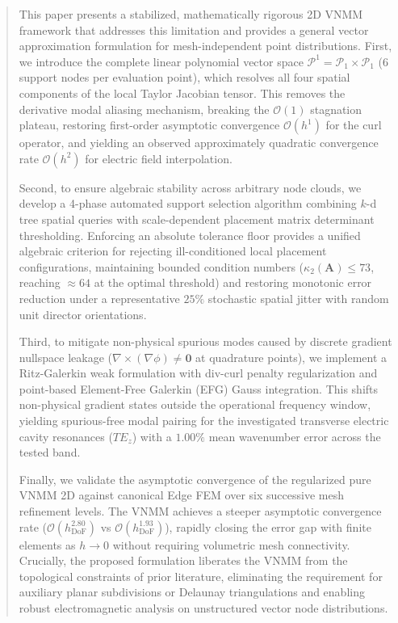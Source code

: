 \documentclass[preprint,12pt]{elsarticle}
\begin{document}
\begin{frontmatter}
\begin{abstract}
This paper presents a stabilized, mathematically rigorous 2D VNMM framework that addresses this limitation and provides a general vector approximation formulation for mesh-independent point distributions. First, we introduce the complete linear polynomial vector space $\mathcal{P}^1 = \mathcal{P}_1 \times \mathcal{P}_1$ ($6$ support nodes per evaluation point), which resolves all four spatial components of the local Taylor Jacobian tensor. This removes the derivative modal aliasing mechanism, breaking the $\mathcal{O}(1)$ stagnation plateau, restoring first-order asymptotic convergence $\mathcal{O}(h^{1})$ for the curl operator, and yielding an observed approximately quadratic convergence rate $\mathcal{O}(h^{2})$ for electric field interpolation.

Second, to ensure algebraic stability across arbitrary node clouds, we develop a 4-phase automated support selection algorithm combining $k$-d tree spatial queries with scale-dependent placement matrix determinant thresholding. Enforcing an absolute tolerance floor provides a unified algebraic criterion for rejecting ill-conditioned local placement configurations, maintaining bounded condition numbers ($\kappa_2(\mathbf{A}) \le 73$, reaching $\approx 64$ at the optimal threshold) and restoring monotonic error reduction under a representative $25\%$ stochastic spatial jitter with random unit director orientations.

Third, to mitigate non-physical spurious modes caused by discrete gradient nullspace leakage ($\nabla \times (\nabla \phi) \neq \mathbf{0}$ at quadrature points), we implement a Ritz-Galerkin weak formulation with div-curl penalty regularization and point-based Element-Free Galerkin (EFG) Gauss integration. This shifts non-physical gradient states outside the operational frequency window, yielding spurious-free modal pairing for the investigated transverse electric cavity resonances ($TE_z$) with a $1.00\%$ mean wavenumber error across the tested band.

Finally, we validate the asymptotic convergence of the regularized pure VNMM 2D against canonical Edge FEM over six successive mesh refinement levels. The VNMM achieves a steeper asymptotic convergence rate ($\mathcal{O}(h_{\mathrm{DoF}}^{2.80})$ vs $\mathcal{O}(h_{\mathrm{DoF}}^{1.93})$), rapidly closing the error gap with finite elements as $h \to 0$ without requiring volumetric mesh connectivity. Crucially, the proposed formulation liberates the VNMM from the topological constraints of prior literature, eliminating the requirement for auxiliary planar subdivisions or Delaunay triangulations and enabling robust electromagnetic analysis on unstructured vector node distributions.
\end{abstract}


\end{frontmatter}
\end{document}
